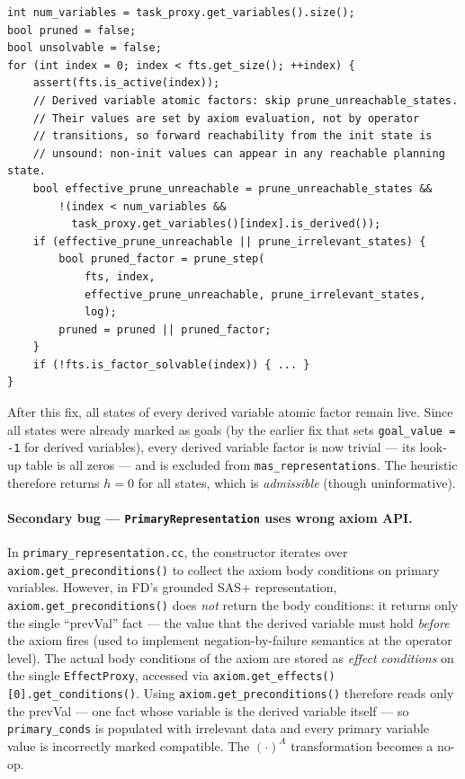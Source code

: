 \documentclass[11pt,a4paper]{article}
\begin{document}
\begin{lstlisting}[caption={Skip unreachable-state pruning for derived variable factors}]
int num_variables = task_proxy.get_variables().size();
bool pruned = false;
bool unsolvable = false;
for (int index = 0; index < fts.get_size(); ++index) {
    assert(fts.is_active(index));
    // Derived variable atomic factors: skip prune_unreachable_states.
    // Their values are set by axiom evaluation, not by operator
    // transitions, so forward reachability from the init state is
    // unsound: non-init values can appear in any reachable planning state.
    bool effective_prune_unreachable = prune_unreachable_states &&
        !(index < num_variables &&
          task_proxy.get_variables()[index].is_derived());
    if (effective_prune_unreachable || prune_irrelevant_states) {
        bool pruned_factor = prune_step(
            fts, index,
            effective_prune_unreachable, prune_irrelevant_states,
            log);
        pruned = pruned || pruned_factor;
    }
    if (!fts.is_factor_solvable(index)) { ... }
}
\end{lstlisting}

After this fix, all states of every derived variable atomic factor remain live.
Since all states were already marked as goals (by the earlier fix that sets
\texttt{goal\_value = -1} for derived variables), every derived variable factor
is now trivial — its look-up table is all zeros — and is excluded from
\texttt{mas\_representations}.  The heuristic therefore returns $h = 0$
for all states, which is \emph{admissible} (though uninformative).

\paragraph{Secondary bug — \texttt{PrimaryRepresentation} uses wrong axiom API.}
In \texttt{primary\_representation.cc}, the constructor iterates over
\texttt{axiom.get\_preconditions()} to collect the axiom body conditions on
primary variables.  However, in FD's grounded SAS+ representation,
\texttt{axiom.get\_preconditions()} does \emph{not} return the body conditions:
it returns only the single ``prevVal'' fact — the value that the derived
variable must hold \emph{before} the axiom fires (used to implement
negation-by-failure semantics at the operator level).  The actual body
conditions of the axiom are stored as \emph{effect conditions} on the single
\texttt{EffectProxy}, accessed via \texttt{axiom.get\_effects()[0].get\_conditions()}.
Using \texttt{axiom.get\_preconditions()} therefore reads only the prevVal —
one fact whose variable is the derived variable itself — so
\texttt{primary\_conds} is populated with irrelevant data and every primary
variable value is incorrectly marked compatible.  The $({\cdot})^A$
transformation becomes a no-op.
\end{document}
